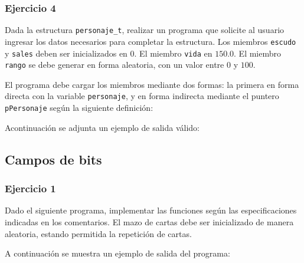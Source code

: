 \subsubsection{Ejercicio 4} 
Dada la estructura  \texttt{personaje\_t}, realizar un programa que solicite al usuario ingresar los datos necesarios para completar la estructura.
Los miembros \texttt{escudo} y \texttt{sales} deben ser inicializados en 0. 
El miembro \texttt{vida} en $150.0$.
El miembro \texttt{rango} se debe generar en forma aleatoria, con un valor entre $0$ y $100$.
\lstset{inputencoding=utf8/latin1}

El programa debe cargar los miembros mediante dos formas: la primera en forma directa con la variable \texttt{personaje}, y en forma indirecta mediante el puntero \texttt{pPersonaje} según la siguiente definición:

\lstset{inputencoding=utf8/latin1}

Acontinuación se adjunta un ejemplo de salida válido:
\lstset{inputencoding=utf8/latin1}
{\small

}

\subsection*{Campos de bits}
\subsubsection*{Ejercicio 1} 
Dado el siguiente programa, implementar las funciones según las especificaciones indicadas en los comentarios.
El mazo de cartas debe ser inicializado de manera aleatoria, estando permitida la repetición de cartas.
\lstset{inputencoding=utf8/latin1}

A continuación se muestra un ejemplo de salida del programa:
\lstset{inputencoding=utf8/latin1}
{\small

}


